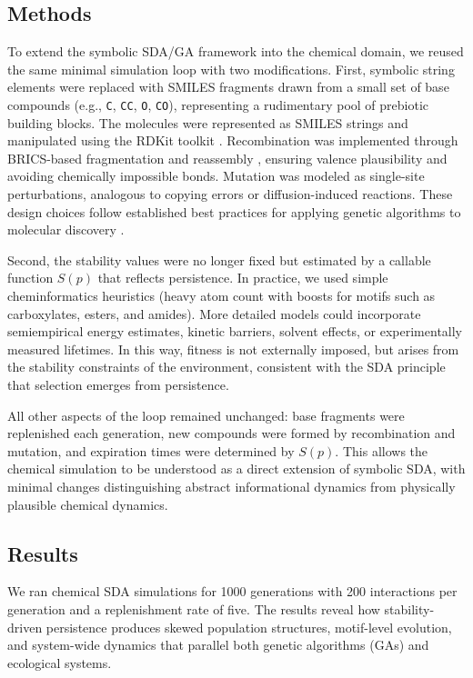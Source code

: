 \documentclass[life,article,submit,pdftex,moreauthors]{Definitions/mdpi}
\begin{document}
\subsection{Methods}
To extend the symbolic SDA/GA framework into the chemical domain, we reused the same minimal simulation loop with two modifications. First, symbolic string elements were replaced with SMILES fragments drawn from a small set of base compounds (e.g., \texttt{C}, \texttt{CC}, \texttt{O}, \texttt{CO}), representing a rudimentary pool of prebiotic building blocks. The molecules were represented as SMILES strings and manipulated using the RDKit toolkit \cite{landrum2006rdkit}. Recombination was implemented through BRICS-based fragmentation and reassembly \cite{degen2008art}, ensuring valence plausibility and avoiding chemically impossible bonds. Mutation was modeled as single-site perturbations, analogous to copying errors or diffusion-induced reactions. These design choices follow established best practices for applying genetic algorithms to molecular discovery \cite{janet2023bestpractices}.

Second, the stability values were no longer fixed but estimated by a callable function $S(p)$ that reflects persistence. In practice, we used simple cheminformatics heuristics (heavy atom count with boosts for motifs such as carboxylates, esters, and amides). More detailed models could incorporate semiempirical energy estimates, kinetic barriers, solvent effects, or experimentally measured lifetimes. In this way, fitness is not externally imposed, but arises from the stability constraints of the environment, consistent with the SDA principle that selection emerges from persistence.

All other aspects of the loop remained unchanged: base fragments were replenished each generation, new compounds were formed by recombination and mutation, and expiration times were determined by $S(p)$. This allows the chemical simulation to be understood as a direct extension of symbolic SDA, with minimal changes distinguishing abstract informational dynamics from physically plausible chemical dynamics.


\subsection{Results}

We ran chemical SDA simulations for 1000 generations with 200 interactions per generation and a replenishment rate of five. The results reveal how stability-driven persistence produces skewed population structures, motif-level evolution, and system-wide dynamics that parallel both genetic algorithms (GAs) and ecological systems.  
\end{document}
